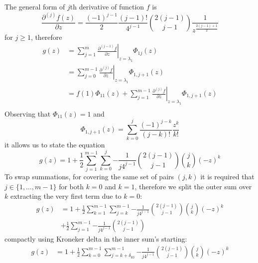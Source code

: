 The general form of $j$th derivative of function $f$ is 
$$\frac{\partial^{(j)}{f}(z)}{\partial{z}} =\frac{(-1)^{j-1}}{2}\frac{(j-1)!}{4^{j-1}}{{2(j-1)}\choose{j-1}}\frac{1}{z^{\frac{2(j-1)+1}{2}}} $$ 
for $j \geq 1$, therefore
\begin{displaymath}
\begin{split}
  g(z) &= \sum_{j=1}^{m}{ \left. \frac{\partial^{(j-1)}{f}}{\partial{z}} \right|_{z=\lambda_{1}}\Phi_{1j}(z)} \\
       &= \sum_{j=0}^{m-1}{ \left. \frac{\partial^{(j)}{f}}{\partial{z}} \right|_{z=\lambda_{1}}\Phi_{1,j+1}(z)} \\
       &= f(1)\Phi_{11}(z) + \sum_{j=1}^{m-1}{ \left. \frac{\partial^{(j)}{f}}{\partial{z}} \right|_{z=\lambda_{1}}\Phi_{1,j+1}(z)} \\
\end{split}
\end{displaymath}
Observing that $\Phi_{11}(z)=1$ and
\begin{displaymath}
  \Phi_{1,j+1}(z) = \sum_{k=0}^{j}{\frac{(-1)^{j-k}}{(j-k)!}\frac{z^{k}}{k!}}
\end{displaymath}
it allows us to state the equation
\begin{equation}
  g(z) = 1 +\frac{1}{2} \sum_{j=1}^{m-1}{\sum_{k=0}^{j}{-\frac{1}{j 4^{j-1}} {{2(j-1)}\choose{j-1}}{{j}\choose{k}} (-z)^{k}}}
\end{equation}
To swap summations, for covering the same set of pairs $(j, k)$ it is required that 
$j\in \lbrace 1, \ldots, m-1 \rbrace$ for both $k=0$ and $k=1$, therefore we split
the outer sum over $k$ extracting the very first term due to $k=0$:
\begin{equation}
\begin{split}
  g(z) &= 1 +\frac{1}{2} \sum_{k=1}^{m-1}{\sum_{j=k}^{m-1}{-\frac{1}{j 4^{j-1}} {{2(j-1)}\choose{j-1}}{{j}\choose{k}} (-z)^{k}}} \\
       &+ \frac{1}{2}\sum_{j=1}^{m-1}{-\frac{1}{j 4^{j-1}} {{2(j-1)}\choose{j-1}}}
\end{split}
\end{equation}
compactly using Kroneker delta in the inner sum's starting:
\begin{equation}
\begin{split}
  g(z) &= 1 +\frac{1}{2} \sum_{k=0}^{m-1}{\sum_{j=k+\delta_{k0}}^{m-1}{-\frac{1}{j 4^{j-1}} {{2(j-1)}\choose{j-1}}{{j}\choose{k}} (-z)^{k}}} \\
\end{split}
\end{equation}

